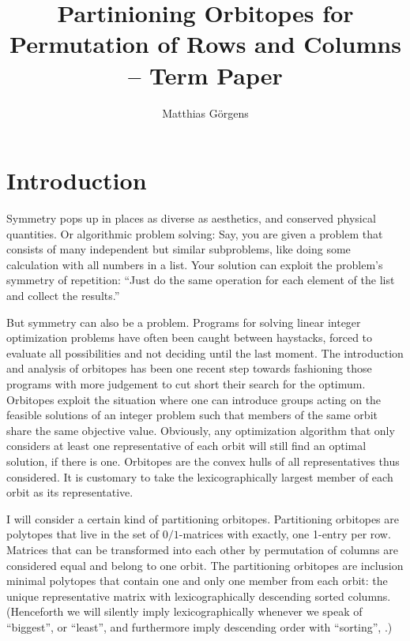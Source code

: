 \documentclass[a4paper]{amsart}
\author{Matthias Görgens}
\theoremstyle{lemma}
\theoremstyle{definition}
\theoremstyle{remark}
\theoremstyle{example}
\def\eg{\emph{e.g.}}
\newcommand\mpar[1]{\marginpar {\flushleft\sffamily\small #1}}
\newcounter{todo}
\newcommand{\todo}[1]{\({}^{\text{{\arabic{todo}}}}\) \mpar{todo \arabic{todo}: #1} \addtocounter{todo}{1}}
\begin{document}
\title{Partinioning Orbitopes for Permutation of Rows and Columns -- Term Paper}
\maketitle

\section{Introduction}
Symmetry pops up in places as diverse as aesthetics, and conserved
physical quantities.  Or algorithmic problem solving: Say, you are
given a problem that consists of many independent but similar
subproblems, like doing some calculation with all numbers in a list.
Your solution can exploit the problem's symmetry of repetition: ``Just
do the same operation for each element of the list and collect the
results.''%

But symmetry can also be a problem.  Programs for solving linear
integer optimization problems have often been caught between
haystacks, forced to evaluate all possibilities and not deciding until
the last moment.  The introduction and analysis of orbitopes has been
one recent step towards fashioning those programs with more judgement
to cut short their search for the optimum.  Orbitopes exploit the
situation where one can introduce groups acting on the feasible
solutions of an integer problem such that members of the same orbit
share the same objective value.  Obviously, any optimization algorithm
that only considers at least one representative of each orbit will
still find an optimal solution, if there is one.  Orbitopes are the
convex hulls of all representatives thus considered.  It is customary
to take the lexicographically largest member of each orbit as its
representative.

I will consider a certain kind of partitioning orbitopes.
Partitioning orbitopes are polytopes that live in the set of
\(0/1\)-matrices with exactly, one 1-entry per row.  Matrices that can
be transformed into each other by permutation of columns are
considered equal and belong to one orbit.  The partitioning orbitopes
are inclusion minimal polytopes that contain one and only one member
from each orbit: the unique representative matrix with
lexicographically descending sorted columns.  (Henceforth we will
silently imply lexicographically whenever we speak of ``biggest'', or
``least'', and furthermore imply descending order with ``sorting'', .)
\end{document}
